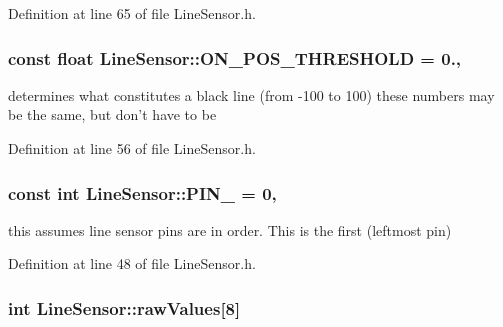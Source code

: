 Definition at line 65 of file Line\-Sensor.\-h.

\hypertarget{classLineSensor_a3e3c5f134159562e56fcd06e55cc7024}{
\subsubsection[{O\-N\-\_\-\-P\-O\-S\-\_\-\-T\-H\-R\-E\-S\-H\-O\-L\-D}]{\setlength{\rightskip}{0pt plus 5cm}const float Line\-Sensor\-::\-O\-N\-\_\-\-P\-O\-S\-\_\-\-T\-H\-R\-E\-S\-H\-O\-L\-D = 0.\hspace{0.3cm}{\ttfamily [static]}, {\ttfamily [private]}}}\label{classLineSensor_a3e3c5f134159562e56fcd06e55cc7024}


determines what constitutes a black line (from -\/100 to 100) these numbers may be the same, but don't have to be 



Definition at line 56 of file Line\-Sensor.\-h.

\hypertarget{classLineSensor_a873c5b45cdfa14ff468db018e1e0055a}{
\subsubsection[{P\-I\-N\-\_\-0}]{\setlength{\rightskip}{0pt plus 5cm}const int Line\-Sensor\-::\-P\-I\-N\-\_ = 0\hspace{0.3cm}{\ttfamily [static]}, {\ttfamily [private]}}}\label{classLineSensor_a873c5b45cdfa14ff468db018e1e0055a}


this assumes line sensor pins are in order. This is the first (leftmost pin) 



Definition at line 48 of file Line\-Sensor.\-h.

\hypertarget{classLineSensor_a0d48bb25f8e1ee25a4757b9e201bd1a9}{
\subsubsection[{raw\-Values}]{\setlength{\rightskip}{0pt plus 5cm}int Line\-Sensor\-::raw\-Values\mbox{[}8\mbox{]}\hspace{0.3cm}{\ttfamily [private]}}}\label{classLineSensor_a0d48bb25f8e1ee25a4757b9e201bd1a9}


